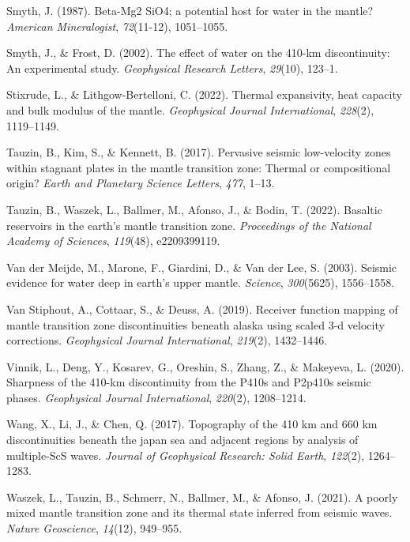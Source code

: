 \documentclass[draft,linenumbers]{agujournal2019}
\newlength{\cslhangindent}
\newenvironment{CSLReferences}[2]
 {\begin{list}{}{
  \setlength{\itemindent}{0pt}
  \setlength{\leftmargin}{0pt}
  \setlength{\parsep}{0pt}
  \ifodd #1
   \setlength{\leftmargin}{\cslhangindent}
   \setlength{\itemindent}{-\cslhangindent}
  \fi
  \setlength{\itemsep}{#2\baselineskip}
  }
  \item\relax}
 {\end{list}}
\begin{document}
\begin{CSLReferences}{1}{0}
Smyth, J. (1987). Beta-Mg2 SiO4; a potential host for water in the
mantle? \emph{American Mineralogist}, \emph{72}(11-12), 1051--1055.

Smyth, J., \& Frost, D. (2002). The effect of water on the 410-km
discontinuity: An experimental study. \emph{Geophysical Research
Letters}, \emph{29}(10), 123--1.

Stixrude, L., \& Lithgow-Bertelloni, C. (2022). Thermal expansivity,
heat capacity and bulk modulus of the mantle. \emph{Geophysical Journal
International}, \emph{228}(2), 1119--1149.

Tauzin, B., Kim, S., \& Kennett, B. (2017). Pervasive seismic
low-velocity zones within stagnant plates in the mantle transition zone:
Thermal or compositional origin? \emph{Earth and Planetary Science
Letters}, \emph{477}, 1--13.

Tauzin, B., Waszek, L., Ballmer, M., Afonso, J., \& Bodin, T. (2022).
Basaltic reservoirs in the earth's mantle transition zone.
\emph{Proceedings of the National Academy of Sciences}, \emph{119}(48),
e2209399119.

Van der Meijde, M., Marone, F., Giardini, D., \& Van der Lee, S. (2003).
Seismic evidence for water deep in earth's upper mantle. \emph{Science},
\emph{300}(5625), 1556--1558.

Van Stiphout, A., Cottaar, S., \& Deuss, A. (2019). Receiver function
mapping of mantle transition zone discontinuities beneath alaska using
scaled 3-d velocity corrections. \emph{Geophysical Journal
International}, \emph{219}(2), 1432--1446.

Vinnik, L., Deng, Y., Kosarev, G., Oreshin, S., Zhang, Z., \& Makeyeva,
L. (2020). Sharpness of the 410-km discontinuity from the P410s and
P2p410s seismic phases. \emph{Geophysical Journal International},
\emph{220}(2), 1208--1214.

Wang, X., Li, J., \& Chen, Q. (2017). Topography of the 410 km and 660
km discontinuities beneath the japan sea and adjacent regions by
analysis of multiple-ScS waves. \emph{Journal of Geophysical Research:
Solid Earth}, \emph{122}(2), 1264--1283.

Waszek, L., Tauzin, B., Schmerr, N., Ballmer, M., \& Afonso, J. (2021).
A poorly mixed mantle transition zone and its thermal state inferred
from seismic waves. \emph{Nature Geoscience}, \emph{14}(12), 949--955.


\end{CSLReferences}
\end{document}
